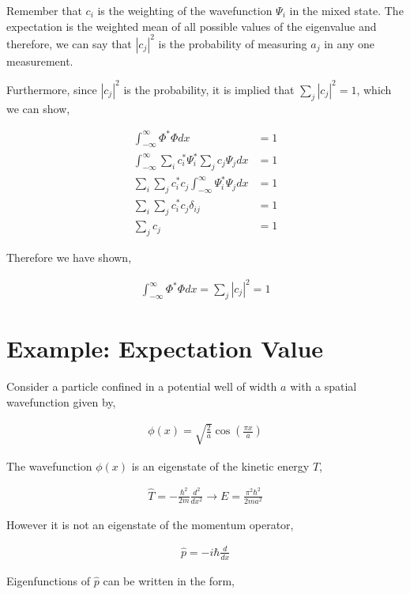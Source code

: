 \documentclass[11pt]{amsart}
\begin{document}
Remember that $c_i$ is the weighting of the wavefunction $\Psi_i$ in the mixed state. The expectation is the weighted mean of all possible values of the eigenvalue and therefore, we can say that ${|c_j|}^2$ is the probability of measuring $a_j$ in any one measurement.

Furthermore, since ${|c_j|}^2$ is the probability, it is implied that $\sum\limits_j {|c_j|}^2 = 1$, which we can show,

\begin{align*}
  \int_{-\infty}^{\infty} \Phi^*\Phi dx &= 1 \\
  \int_{-\infty}^{\infty} \sum\limits_i c_i^* \Psi_i^* \sum\limits_j c_j \Psi_j dx &= 1 \\
  \sum\limits_i \sum\limits_j c_i^* c_j \int_{-\infty}^{\infty} \Psi_i^* \Psi_j dx &= 1 \\
  \sum\limits_i \sum\limits_j c_i^* c_j \delta_{ij} &= 1 \\
  \sum\limits_j c_j &= 1
\end{align*}

Therefore we have shown,

\begin{align*}
  \int_{-\infty}^{\infty} \Phi^*\Phi dx = \sum\limits_j {|c_j|}^2 = 1
\end{align*}

\section{Example: Expectation Value}

Consider a particle confined in a potential well of width $a$ with a spatial wavefunction given by,

\begin{align*}
  \phi(x) = \sqrt{\frac{2}{a}} \cos{\left(\frac{\pi x}{a}\right)}
\end{align*}

The wavefunction $\phi(x)$ is an eigenstate of the kinetic energy $T$,

\begin{align*}
  \hat{T} = -\frac{\hbar^2}{2m} \frac{d^2}{dx^2} \to E = \frac{\pi^2\hbar^2}{2ma^2}
\end{align*}

However it is not an eigenstate of the momentum operator,

\begin{align*}
  \hat{p} = -i\hbar\frac{d}{dx}
\end{align*}

Eigenfunctions of $\hat{p}$ can be written in the form,
\end{document}
